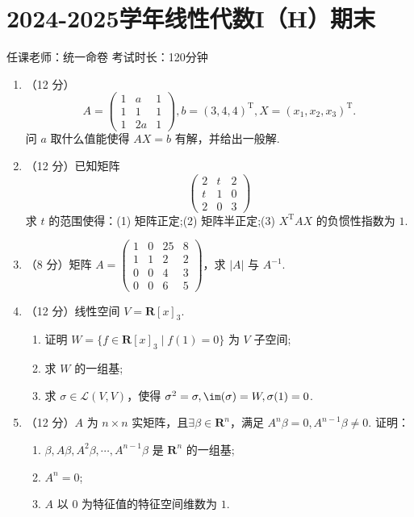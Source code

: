 \section{2024-2025学年线性代数I（H）期末}

\begin{center}
    任课老师：统一命卷\hspace{4em} 考试时长：120分钟
\end{center}

\begin{enumerate}
    \item （12 分）
    \[  A=\begin{pmatrix}
        1 & a & 1 \\
        1 & 1 & 1 \\
        1 & 2a & 1
    \end{pmatrix}, b=(3,4,4)^\mathrm{T}, X=(x_1,x_2,x_3)^\mathrm{T}.\]
    问 \(a\) 取什么值能使得 \(AX=b\) 有解，并给出一般解.

    \item （12 分）已知矩阵
    \[  \begin{pmatrix}
        2 & t & 2 \\
        t & 1 & 0 \\
        2 & 0 & 3
    \end{pmatrix}
    \]
    求 \(t\) 的范围使得：(1) 矩阵正定;\quad(2) 矩阵半正定;\quad(3) \(X^\mathrm{T}AX\) 的负惯性指数为 \(1\).

    \item （8 分）矩阵 \(A=
    \begin{pmatrix}
    1 & 0 & 25 & 8\\
    1 & 1 & 2 & 2\\
    0 & 0 & 4 & 3\\
    0 & 0 & 6 & 5
    \end{pmatrix}\)，求 \(|A|\) 与 \(A^{-1}\).

    \item （12 分）线性空间 \(V=\mathbf{R}[x]_3\).
    \begin{enumerate}
        \item 证明 \(W=\{f \in \mathbf{R}[x]_3 \mid f(1)=0\}\) 为 \(V\) 子空间;
        \item 求 \(W\) 的一组基;
        \item 求 \(\sigma \in \mathcal{L}(V, V)\)，使得 \(\sigma^2=\sigma, \im(\sigma)=W,\sigma(1)=0\).
    \end{enumerate}

    \item （12 分）\(A\) 为 \(n\times n\) 实矩阵，且\(\exists\beta \in \mathbf{R}^n\)，满足 \(A^n \beta =0, A^{n-1} \beta\neq 0\). 证明：
    \begin{enumerate}
        \item \(\beta, A\beta, A^2\beta,\cdots,A^{n-1}\beta\) 是 \(\mathbf{R}^n\) 的一组基;
        \item \(A^n=0\);
        \item \(A\) 以 \(0\) 为特征值的特征空间维数为 \(1\).
    \end{enumerate}


\end{enumerate}

